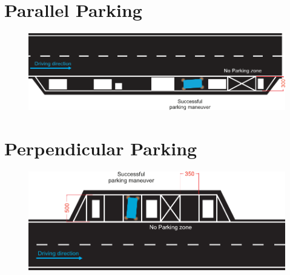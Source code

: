 \begin{figure}[H]
\begin{center}
	\end{center}
\end{figure}

\section{Parallel Parking}
\label{fig_parallel_parking}
\begin{figure}[H]
	\begin{center}
		\centering\includegraphics[]{graphics/Abb_2_parallel_parking}
	\end{center}
\end{figure}

\section{Perpendicular Parking}
\begin{figure}[H]
	\label{fig_perpendicular_parking}
	\begin{center}
		\centering\includegraphics[]{graphics/Abb_3_perpendicular_parking}
	\end{center}
\end{figure}

